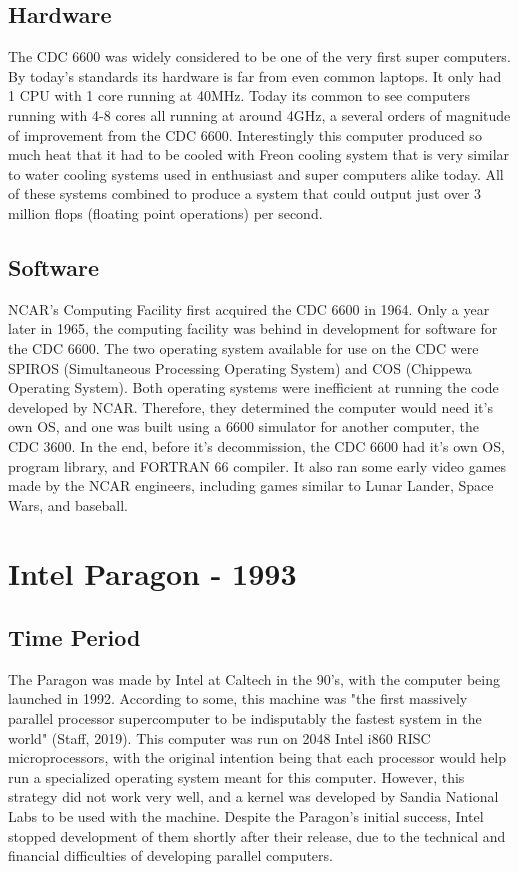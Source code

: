 \documentclass[letterpaper, 10 pt, conference]{IEEEconf}
\begin{document}
\subsection{Hardware}
The CDC 6600 was widely considered to be one of the very first super computers. By today's standards its hardware is far from even common laptops. It only had 1 CPU with 1 core running at 40MHz. Today its common to see computers running with 4-8 cores all running at around 4GHz, a several orders of magnitude of improvement from the CDC 6600. Interestingly this computer produced so much heat that it had to be cooled with Freon cooling system that is very similar to water cooling systems used in enthusiast and super computers alike today. All of these systems combined to produce a system that could output just over 3 million flops (floating point operations) per second.   
\subsection{Software}
NCAR's Computing Facility first acquired the CDC 6600 in 1964. 
Only a year later in 1965, the computing facility was behind in 
development for software for the CDC 6600. The two operating 
system available for use on the CDC were SPIROS (Simultaneous
Processing Operating System) and COS (Chippewa Operating System). 
Both operating systems were inefficient at running the code 
developed by NCAR. Therefore, they determined the computer would 
need it's own OS, and one was built using a 6600 simulator for 
another computer, the CDC 3600. In the end, before it's 
decommission, the CDC 6600 had it's own OS, program library, and 
FORTRAN 66 compiler. It also ran some early video games made by 
the NCAR engineers, including games similar to Lunar Lander, Space
Wars, and baseball.


\section{Intel Paragon - 1993}
\subsection{Time Period}
The Paragon was made by Intel at Caltech in the 90's, with the computer being launched in 1992. According to some, this machine was "the first massively parallel processor supercomputer to be indisputably the fastest system in the world" (Staff, 2019). This computer was run on 2048 Intel i860 RISC microprocessors, with the original intention being that each processor would help run a specialized operating system meant for this computer. However, this strategy did not work very well, and a kernel was developed by Sandia National Labs to be used with the machine. Despite the Paragon's initial success, Intel stopped development of them shortly after their release, due to the technical and financial difficulties of developing parallel computers.
\end{document}
